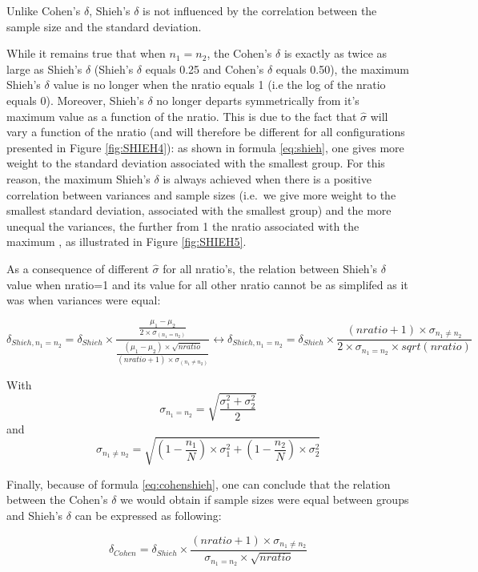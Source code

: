 \documentclass[man]{apa6}
\begin{document}
Unlike Cohen's \(\delta\), Shieh's \(\delta\) is not influenced by the correlation between the sample size and the standard deviation.

While it remains true that when \(n_{1}=n_{2}\), the Cohen's \(\delta\) is exactly as twice as large as Shieh's \(\delta\) (Shieh's \(\delta\) equals 0.25 and Cohen's \(\delta\) equals 0.50), the maximum Shieh's \(\delta\) value is no longer when the nratio equals 1 (i.e the log of the nratio equals 0). Moreover, Shieh's \(\delta\) no longer departs symmetrically from it's maximum value as a function of the nratio. This is due to the fact that \(\hat{\sigma}\) will vary a function of the nratio (and will therefore be different for all configurations presented in Figure \ref{fig:SHIEH4}): as shown in formula \ref{eq:shieh}, one gives more weight to the standard deviation associated with the smallest group. For this reason, the maximum Shieh's \(\delta\) is always achieved when there is a positive correlation between variances and sample sizes (i.e.~we give more weight to the smallest standard deviation, associated with the smallest group) and the more unequal the variances, the further from 1 the nratio associated with the maximum , as illustrated in Figure \ref{fig:SHIEH5}.

As a consequence of different \(\hat{\sigma}\) for all nratio's, the relation between Shieh's \(\delta\) value when nratio=1 and its value for all other nratio cannot be as simplifed as it was when variances were equal:

\begin{equation} 
\delta_{Shieh,n_1=n_2}= \delta_{Shieh} \times \frac{\frac{\mu_1-\mu_2}{2 \times \sigma_{(n_1=n_2)}}}{\frac{(\mu_1-\mu_2) \times \sqrt{nratio}}{(nratio+1) \times \sigma_{(n_1\neq n_2)}}}
\leftrightarrow \delta_{Shieh,n_1=n_2}= \delta_{Shieh} \times \frac{(nratio+1) \times \sigma_{n_1 \neq n_2}}{2 \times \sigma_{n_1=n_2} \times sqrt(nratio)}
\label{eq:shiehvsbaldesign}
\end{equation}

With \[\sigma_{n_1=n_2}= \sqrt{\frac{\sigma_1^2+\sigma_2^2}{2}}\] and
\[\sigma_{n_1 \neq n_2} = \sqrt{(1- \frac{n_1}{N}) \times \sigma_1^2+(1- \frac{n_2}{N}) \times \sigma_2^2}\]

Finally, because of formula \ref{eq:cohenshieh}, one can conclude that the relation between the Cohen's \(\delta\) we would obtain if sample sizes were equal between groups and Shieh's \(\delta\) can be expressed as following:

\begin{equation} 
\delta_{Cohen}= \delta_{Shieh} \times \frac{(nratio+1) \times \sigma_{n_1 \neq n_2}}{\sigma_{n_1=n_2} \times \sqrt{nratio}}
\label{eq:shiehvsbaldesign2}
\end{equation}
\end{document}
